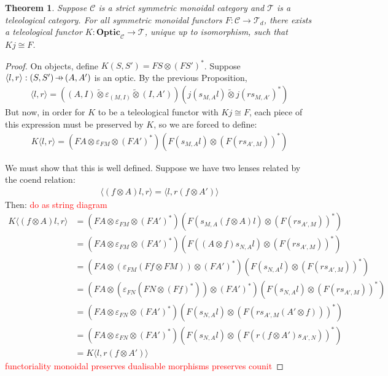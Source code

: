 \documentclass[11pt,a4paper]{article}
\theoremstyle{plain}
\newtheorem{theorem}{Theorem}[subsection]
\theoremstyle{definition}
\newcommand{\C}{\mathscr{C}}
\newcommand{\T}{\mathscr{T}}
\newcommand{\Optic}{\mathbf{Optic}}
\newcommand{\switched}{\mathbin{\tilde{\otimes}}}
\newcommand{\hto}{\ensuremath{\,\mathaccent\shortmid\rightarrow\,}}
\newcommand{\todo}[1]{\textcolor{red}{\small #1}}
\begin{document}
\begin{theorem}
\label{optic-is-free-teleological-cat}
Suppose $\C$ is a strict symmetric monoidal category and $\T$ is a teleological category. For all symmetric monoidal functors $F : \C \to \T_d$, there exists a teleological functor $K : \Optic_\C \to \T$, unique up to isomorphism, such that $Kj \cong F$.
\end{theorem}
\begin{proof}
On objects, define $K(S, S') = FS \otimes (FS')^*$. Suppose $\langle l, r \rangle : (S, S') \hto (A, A')$ is an optic. By the previous Proposition,
\begin{align*}
\langle l, r \rangle = ((A, I) \switched \varepsilon_{(M, I)} \switched (I, A'))(j(s_{M,A}l) \switched j(rs_{M,A'})^*)
\end{align*}
But now, in order for $K$ to be a teleological functor with $Kj \cong F$, each piece of this expression must be preserved by $K$, so we are forced to define:
\begin{align*}
K\langle l, r \rangle = (FA \otimes \varepsilon_{FM} \otimes (FA')^*)(F(s_{M,A}l) \otimes (F(rs_{A', M}))^* )
\end{align*}

We must show that this is well defined. Suppose we have two lenses related by the coend relation:
\begin{align*}
\langle (f \otimes A) l, r \rangle = \langle l, r (f \otimes A') \rangle
\end{align*}
Then: \todo{do as string diagram}
\begin{align*}
K\langle (f \otimes A) l, r \rangle 
&= (FA \otimes \varepsilon_{FM} \otimes (FA')^*)(F(s_{M,A}(f \otimes A)l) \otimes (F(rs_{A',M}))^* ) \\
&= (FA \otimes \varepsilon_{FM} \otimes (FA')^*)(F((A \otimes f)s_{N,A}l) \otimes (F(rs_{A',M}))^* ) \\
&= (FA \otimes (\varepsilon_{FM} (Ff \otimes FM)) \otimes (FA')^*)(F(s_{N,A}l) \otimes (F(rs_{A',M}))^* ) \\
&= (FA \otimes (\varepsilon_{FN} (FN \otimes (Ff)^*)) \otimes (FA')^*)(F(s_{N,A}l) \otimes (F(rs_{A',M}))^* ) \\
&= (FA \otimes \varepsilon_{FN} \otimes (FA')^*)(F(s_{N,A}l) \otimes (F(rs_{A',M}(A' \otimes f)))^* ) \\
&= (FA \otimes \varepsilon_{FN} \otimes (FA')^*)(F(s_{N,A}l) \otimes (F(r(f \otimes A')s_{A',N}))^* ) \\
&= K\langle  l, r (f \otimes A') \rangle 
\end{align*}
\todo{functoriality} \todo{monoidal} \todo{preserves dualisable morphisms} \todo{preserves counit}
\end{proof}
\end{document}
